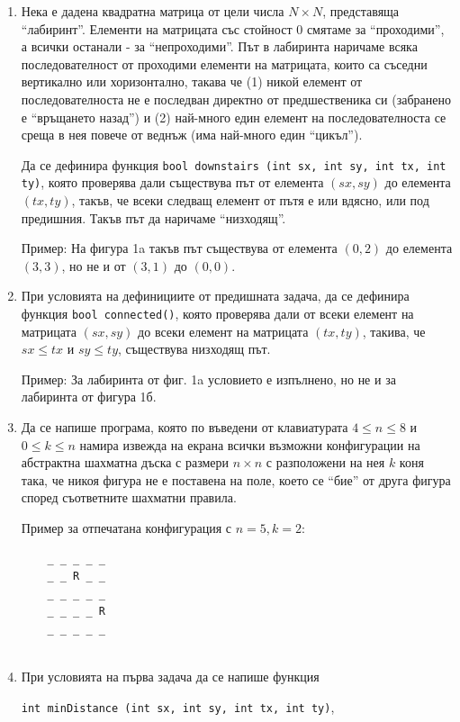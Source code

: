 \documentclass[12pt,a4paper]{article}
\begin{document}
\begin{enumerate}
	
	\item Нека е дадена квадратна матрица от цели числа $N \times N$, представяща ``лабиринт''. Елементи на матрицата със стойност $0$ смятаме за ``проходими'', а всички останали - за ``непроходими''. Път в лабиринта наричаме всяка последователност от проходими елементи на матрицата, които са съседни вертикално или хоризонтално, такава че (1) никой елемент от последователноста не е последван директно от предшественика си (забранено е ``връщането назад'') и (2) най-много един елемент на последователноста се среща в нея повече от веднъж (има най-много един ``цикъл'').

	Да се дефинира функция \texttt{bool downstairs (int sx, int sy, int tx, int ty)}, която проверява дали съществува път от елемента $(sx,sy)$ до елемента $(tx,ty)$, такъв, че всеки следващ елемент от пътя е или вдясно, или под предишния. Такъв път да наричаме ``низходящ''. 

	Пример: На фигура 1a такъв път съществува от елемента $(0,2)$ до елемента $(3,3)$, но не и от $(3,1)$ до $(0,0)$.

	\item При условията на дефинициите от предишната задача, да се дефинира функция \texttt{bool connected()}, която проверява дали от всеки елемент на матрицата $(sx,sy)$ до всеки елемент на матрицата  $(tx,ty)$, такива, че $sx \leq tx$ и $sy \leq ty$, съществува низходящ път. 

	Пример: За лабиринта от фиг. 1a условието е изпълнено, но не и за лабиринта от фигура 1б.


	\item Да се напише програма, която по въведени от клавиатурата $4 \le n \le 8$ и $0 \le k \le n$ намира извежда на екрана всички възможни конфигурации на абстрактна шахматна дъска с размери $n \times n$ с разположени на нея $k$ коня така, че никоя фигура не е поставена на поле, което се ``бие'' от друга фигура според съответните шахматни правила. 

	Пример за отпечатана конфигурация с $n=5, k=2$:
	\begin{verbatim}
	_ _ _ _ _
	_ _ R _ _
	_ _ _ _ _
	_ _ _ _ R
	_ _ _ _ _
		
	\end{verbatim}


	\item При условията на първа задача да се напише функция

	\texttt{int minDistance (int sx, int sy, int tx, int ty)},


\end{enumerate}
\end{document}
